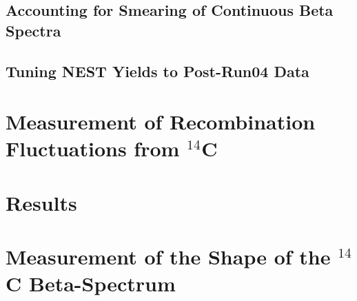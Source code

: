 \subsection{Accounting for Smearing of Continuous Beta Spectra}


\subsection{Tuning NEST Yields to Post-Run04 Data}


\section{Measurement of Recombination Fluctuations from $^{14}$C}


\section{Results }


\section{Measurement of the Shape of the $^{14}$C Beta-Spectrum}


















